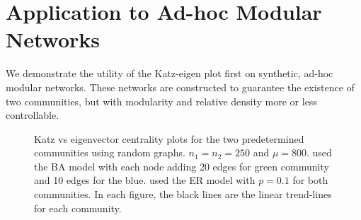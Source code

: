\documentclass{IEEEtran}
\begin{document}
	\section{Application to Ad-hoc Modular Networks}
	\label{s:randomGraphs}
	We demonstrate the utility of the Katz-eigen plot first on synthetic, ad-hoc modular networks. These networks are constructed to guarantee the existence of two communities, but with modularity and relative density more or less controllable. 
	
	\begin{figure}
		\centering
		\caption{Katz vs eigenvector centrality plots for the two predetermined communities using random graphs. $n_1=n_2=250$ and $\mu=800$.  used the BA model with each node adding 20 edges for green community and 10 edges for the blue.  used the ER model with $p=0.1$ for both communities. In each figure, the black lines are the linear trend-lines for each community.}
		\label{fig:example}
	\end{figure}
\end{document}
